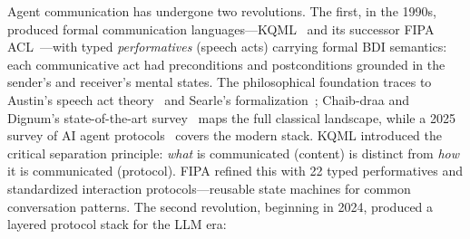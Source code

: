 \documentclass{article}
\begin{document}
%
%
%
%
%

Agent communication has undergone two revolutions. The first, in the 1990s, produced
formal communication languages---KQML~\citep{finin1994kqml, sutra772_kqml2019} and
its successor FIPA ACL~\citep{fipaacl2002, sutra16063_fipa1998}---with typed
\emph{performatives} (speech acts) carrying formal BDI semantics: each communicative
act had preconditions and postconditions grounded in the sender's and receiver's
mental states. The philosophical foundation traces to Austin's speech act
theory~\citep{sutra3415_how1975} and Searle's formalization~\citep{sutra3661_speech1969,
sutra3583_speech1970}; Chaib-draa and Dignum's state-of-the-art
survey~\citep{sutra12751_state2000} maps the full classical landscape, while
a 2025 survey of AI agent protocols~\citep{sutra2444_survey2025} covers the
modern stack. KQML introduced the critical separation
principle: \emph{what} is communicated (content) is distinct from \emph{how} it is
communicated (protocol). FIPA refined this with 22 typed performatives and standardized
interaction protocols---reusable state machines for common conversation patterns. The
second revolution, beginning in 2024, produced a layered protocol stack for the LLM era:
\end{document}
